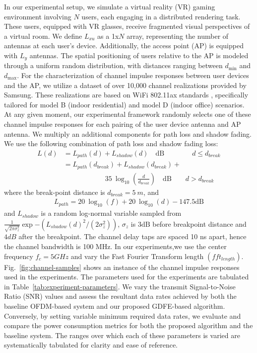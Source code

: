 In our experimental setup, we simulate a virtual reality (VR) gaming environment involving \( N \) users, each engaging in a distributed rendering task. These users, equipped with VR glasses, receive fragmented visual perspectives of a virtual room. We define \( L_{xu} \) as a 1x\( N \) array, representing the number of antennas at each user's device. Additionally, the access point (AP) is equipped with \( L_y \) antennas. The spatial positioning of users relative to the AP is modeled through a uniform random distribution, with distances ranging between \( d_{\text{min}} \) and \( d_{\text{max}} \). For the characterization of channel impulse responses between user devices and the AP, we utilize a dataset of over 10,000 channel realizations provided by Samsung. These realizations are based on WiFi 802.11ax standards \cite{802.11ax}, specifically tailored for model B (indoor residential) and model D (indoor office) scenarios. At any given moment, our experimental framework randomly selects one of these channel impulse responses for each pairing of the user device antenna and AP antenna. We multiply an additional components for path loss and shadow fading. We use the following combination of path loss and shadow fading loss:
\begin{equation}
    \begin{aligned}
        L(d) &= L_{path}(d) + L_{shadow}(d) \quad \textrm{dB}  \qquad \qquad d \leq d_{break} \\
    &= L_{path}(d_{break}) + L_{shadow}(d_{break}) + \\ & \qquad \qquad \qquad 35 \: \operatorname{log}_{10}(\frac{d}{d_{break}}) \quad \textrm{dB}  \qquad d>d_{break}
    \end{aligned}
\end{equation}
where the break-point distance is $d_{break} = 5\:m$, and 
\begin{align}
    L_{path} =  20 \: \operatorname{log}_{10}(f) + 20\: \operatorname{log}_{10}(d)  - 147.5 \textrm{dB}
\end{align}
and $L_{shadow}$ is a random log-normal variable sampled from $\frac{1}{\sqrt{2 \pi \sigma^{2}_{z}}}\exp{-(L_{shadow}(d)^{2}/(2\sigma^{2}_{z}))}$, $\sigma_{z}$ is $3 \textrm{dB}$ before breakpoint distance and $4 dB$ after the breakpoint. The channel delay taps are spaced 10 ns apart, hence the channel bandwidth is 100 MHz. In our experiments,we use the center frequency $f_{c}=5 GHz$ and vary the Fast Fourier Transform length $(fft_{length})$. Fig.~\ref{fig:channel-samples} shows an instance of the channel impulse responses used in the experiments. The parameters used for the experiments are tabulated in Table~\ref{tab:experiment-parameters}. We vary the transmit Signal-to-Noise Ratio (SNR) values and assess the resultant data rates achieved by both the baseline OFDM-based system and our proposed GDFE-based algorithm. Conversely, by setting variable minimum required data rates, we evaluate and compare the power consumption metrics for both the proposed algorithm and the baseline system. The ranges over which each of these parameters is varied are systematically tabulated for clarity and ease of reference.

